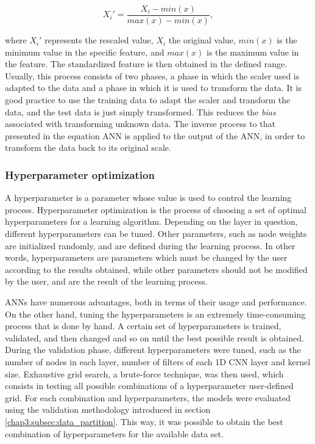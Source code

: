 \begin{equation}
     X_i' = \frac{X_i - min(x) }{max(x)-min(x)},
\label{minmax}
\end{equation}

where $X_i'$ represents the rescaled value, $X_i$ the original value, $min(x)$ is the minimum value in the specific feature, and $max(x)$ is the maximum value in the feature. The standardized feature is then obtained in the defined range. Usually, this process consists of two phases, a phase in which the scaler used is adapted to the data and a phase in which it is used to transform the data. It is good practice to use the training data to adapt the scaler and transform the data, and the test data is just simply transformed. This reduces the \textit{bias} associated with transforming unknown data. The inverse process to that presented in the equation \ac{ANN} is applied to the output of the \ac{ANN}, in order to transform the data back to its original scale.



\subsubsection{Hyperparameter optimization} \label{chap3:subsubsec:hyperparameter_optimization}

A hyperparameter is a parameter whose value is used to control the learning process. Hyperparameter optimization is the process of choosing a set of optimal hyperparameters for a learning algorithm. Depending on the layer in question, different hyperparameters can be tuned. Other parameters, such as node weights are initialized randomly, and are defined during the learning process. In other words, hyperparameters are parameters which must be changed by the user according to the results obtained, while other parameters should not be modified by the user, and are the result of the learning process.

\ac{ANN}s have numerous advantages, both in terms of their usage and performance. On the other hand, tuning the hyperparameters is an extremely time-consuming process that is done by hand. A certain set of hyperparameters is trained, validated, and then changed and so on until the best possible result is obtained. During the validation phase, different hyperparameters were tuned, such as the number of nodes in each layer, number of filters of each \ac{1D CNN} layer and kernel size. Exhaustive grid search, a brute-force technique, was then used, which consists in testing all possible combinations of a hyperparameter user-defined grid. For each combination and hyperparameters, the models were evaluated using the validation methodology introduced in section \ref{chap3:subsec:data_partition}. This way, it was possible to obtain the best combination of hyperparameters for the available data set.

